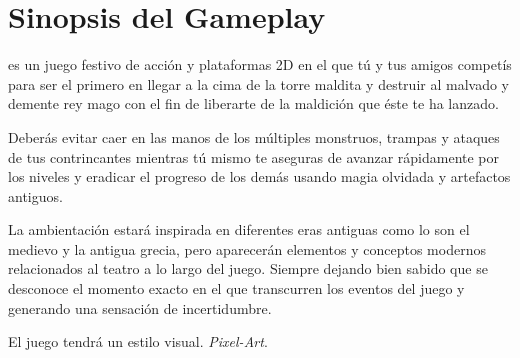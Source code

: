 \section{Sinopsis del Gameplay}%



\emph{\izenburua } es un juego festivo de acción y plataformas 2D en el que tú y
tus amigos competís para ser el primero en llegar a la cima de la torre maldita
y destruir al malvado y demente rey mago con el fin de liberarte de la maldición
que éste te ha lanzado.




Deberás evitar caer en las manos de los múltiples monstruos, trampas y ataques
de tus contrincantes mientras tú mismo te aseguras de avanzar rápidamente por
los niveles y eradicar el progreso de los demás usando magia olvidada y
artefactos antiguos.


La ambientación estará inspirada en diferentes eras antiguas como lo son el
medievo y la antigua grecia, pero aparecerán elementos y conceptos modernos
relacionados al teatro a lo largo del juego. Siempre dejando bien sabido que se
desconoce el momento exacto en el que transcurren los eventos del juego y
generando una sensación de incertidumbre.


El juego tendrá un estilo visual. \emph{Pixel-Art}. 
